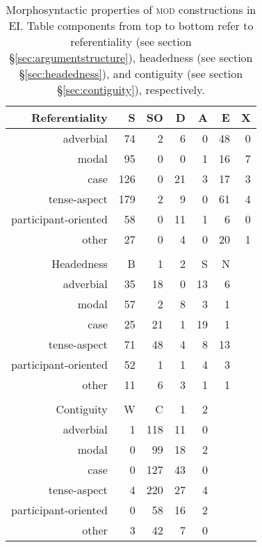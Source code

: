 \begin{table}
\centering

\begin{tabular}{rrrrrrr}
  \lsptoprule
Referentiality & S & SO & D & A & E & X \\ 
  \hline
  adverbial &  74 &   2 &   6 &   0 &  48 &   0 \\ 
  modal &  95 &   0 &   0 &   1 &  16 &   7 \\ 
  case & 126 &   0 &  21 &   3 &  17 &   3 \\ 
  tense-aspect & 179 &   2 &   9 &   0 &  61 &   4 \\ 
  participant-oriented &  58 &   0 &  11 &   1 &   6 &   0 \\ 
  other &  27 &   0 &   4 &   0 &  20 &   1 \\ 
   \hline
 \\
  \hline
Headedness & B & 1 & 2 & S & N \\ 
  \hline
  adverbial &  35 &  18 &   0 &  13 &   6 \\ 
  modal &  57 &   2 &   8 &   3 &   1 \\ 
  case &  25 &  21 &   1 &  19 &   1 \\ 
  tense-aspect &  71 &  48 &   4 &   8 &  13 \\ 
  participant-oriented &  52 &   1 &   1 &   4 &   3 \\ 
  other &  11 &   6 &   3 &   1 &   1 \\ 
   \hline
 \\
  \hline
Contiguity & W & C & 1 & 2 \\ 
  \hline
  adverbial &   1 & 118 &  11 &   0 \\ 
  modal &   0 &  99 &  18 &   2 \\ 
  case &   0 & 127 &  43 &   0 \\ 
  tense-aspect &   4 & 220 &  27 &   4 \\ 
  participant-oriented &   0 &  58 &  16 &   2 \\ 
  other &   3 &  42 &   7 &   0 \\ 
   \hline
\end{tabular}
\caption[Morphosyntactic properties of \textsc{mod} constructions]{Morphosyntactic properties of \textsc{mod} constructions in EI. Table components from top to bottom refer to referentiality (see section §\ref{sec:argumentstructure}), headedness (see section §\ref{sec:headedness}), and contiguity (see section §\ref{sec:contiguity}), respectively.}
\label{table:mod_formal}

\end{table}


